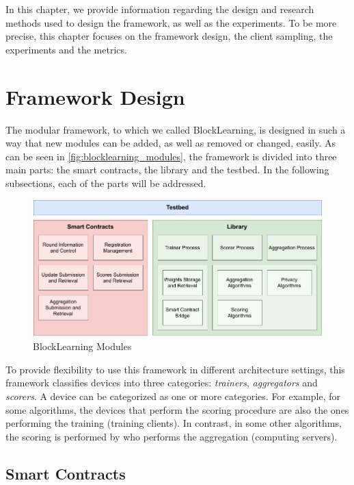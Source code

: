 In this chapter, we provide information regarding the design and research methods used to design the framework, as well as the experiments. To be more precise, this chapter focuses on the framework design, the client sampling, the experiments and the metrics.

\section{Framework Design}

The modular framework, to which we called BlockLearning, is designed in such a way that new modules can be added, as well as removed or changed, easily. As can be seen in \autoref{fig:blocklearning_modules}, the framework is divided into three main parts: the smart contracts, the library and the testbed. In the following subsections, each of the parts will be addressed.

\begin{figure}[!ht]
    \centering
    \includegraphics[width=1\textwidth]{graphics/modules.pdf}
    \caption{BlockLearning Modules}
    \label{fig:blocklearning_modules}
\end{figure}

To provide flexibility to use this framework in different architecture settings, this framework classifies devices into three categories: \textit{trainers}, \textit{aggregators} and \textit{scorers}. A device can be categorized as one or more categories. For example, for some algorithms, the devices that perform the scoring procedure are also the ones performing the training (training clients). In contrast, in some other algorithms, the scoring is performed by who performs the aggregation (computing servers).

\subsection{Smart Contracts}

